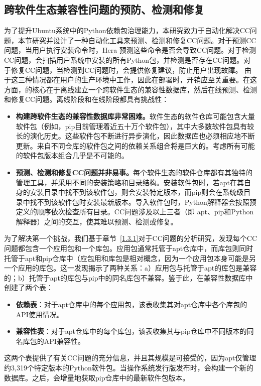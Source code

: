 \subsection{跨软件生态兼容性问题的预防、检测和修复}
为了提升Ubuntu系统中的Python依赖包治理能力，本研究致力于自动化解决CC问题，本节研究并设计了一种自动化工具\tool{}来预测、检测和修复CC问题。对于预测CC问题，当用户执行安装命令时，Hera
预测这些命令是否会导致CC问题。对于检测CC问题，\tool{}会扫描用户系统中安装的所有Python包，并检测是否存在CC问题。对于修复CC问题，当检测到CC问题时，\tool{}会提供修复建议，防止用户出现故障。
由于这三种情况都在用户的生产环境中工作，因此在部署\tool{}时，开销应至关重要。在这方面，\tool{}的核心在于离线建立一个跨软件生态的兼容性数据库，然后在线预测、检测和修复CC问题。离线阶段和在线阶段都具有挑战性：
\begin{itemize}
	\item \textbf{构建跨软件生态的兼容性数据库非常困难。}软件生态的软件仓库可能包含大量软件包（例如，pip目前管理着近五十万个软件包），其中大多数软件包具有较长的演化历史。这些软件包不断进行异步演化，因此数据库也必须相应地不断更新。来自不同仓库的软件包之间的依赖关系组合将是巨大的。考虑所有可能的软件包版本组合几乎是不可能的。
	\item\textbf{ 预测、检测和修复CC问题并非易事。}每个软件生态的软件仓库都有其独特的管理工具，并采用不同的安装策略和目录结构。安装软件包时，若apt在其自身的安装目录中找不到该软件包，则会安装特定版本，而pip则会在系统级目录中找不到该软件包时安装最新版本。导入软件包时，Python解释器会按照预定义的顺序依次检查所有目录。CC问题涉及以上三者（即 apt、pip和Python解释器）之间的交互，使其难以预测、检测或修复。
\end{itemize}

为了解决第一个挑战，我们基于章节~\ref{1.3.1}对于CC问题的分析研究，发现每个CC问题都包含一个应用包和一个库包。应用包通常托管于apt仓库中，而库包则同时托管于apt和pip仓库中（应包用和库包是相对概念，因为一个应用包本身可能是另一个应用的库包。这一发现揭示了两种关系：a）应用包与托管于apt的库包是兼容的；b）托管于apt的库包与pip中的同名库包不兼容。鉴于此，\tool{}在兼容性数据库中创建了两个表：
\begin{itemize}
	\item \textbf{依赖表}：对于apt仓库中的每个应用包，该表收集其对apt仓库中各个库包的API使用情况。
	\item\textbf{ 兼容性表}：对于apt仓库中的每个库包，该表收集其与pip仓库中不同版本的同名库包的API兼容性。
\end{itemize}
这两个表提供了有关CC问题的充分信息，并且其规模是可接受的，因为apt仅管理约3,319个特定版本的Python软件包。当操作系统发行版发布时，\tool{}会构建一个新的数据库。之后，\tool{}会增量地获取pip仓库中的最新软件包版本。

